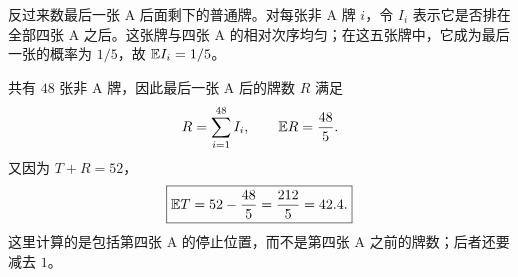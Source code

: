 反过来数最后一张 A 后面剩下的普通牌。对每张非 A 牌 $i$，令 $I_i$ 表示它是否排在全部四张 A 之后。这张牌与四张 A 的相对次序均匀；在这五张牌中，它成为最后一张的概率为 $1/5$，故 $\mathbb{E} I_i=1/5$。

共有 $48$ 张非 A 牌，因此最后一张 A 后的牌数 $R$ 满足
\[
R=\sum_{i=1}^{48}I_i,\qquad \mathbb{E} R=\frac{48}{5}.
\]
又因为 $T+R=52$，
\[
\boxed{\mathbb{E} T=52-\frac{48}{5}=\frac{212}{5}=42.4.}
\]
这里计算的是包括第四张 A 的停止位置，而不是第四张 A 之前的牌数；后者还要减去 $1$。
